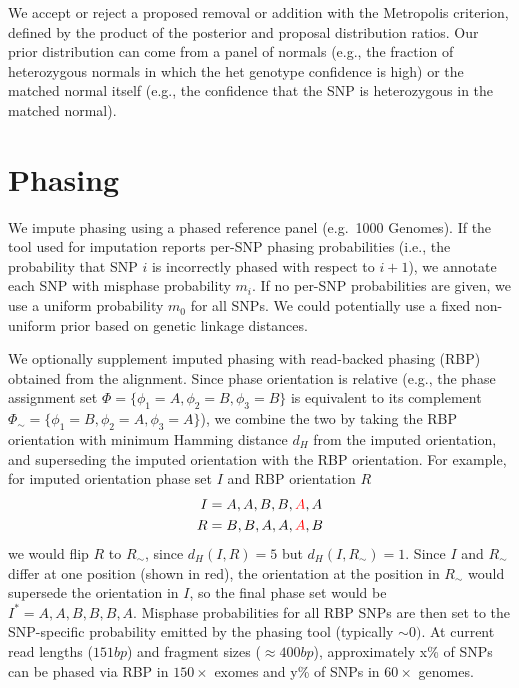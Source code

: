 \documentclass[10pt,letter]{article}
\numberwithin{equation}{section}
\newcommand{\rt}{\right}
\newcommand{\lt}{\left}
\begin{document}
We accept or reject a proposed removal or addition with the Metropolis criterion, defined by the product of the posterior and proposal distribution ratios. Our prior distribution can come from a panel of normals (e.g., the fraction of heterozygous normals in which the het genotype confidence is high) or the matched normal itself (e.g., the confidence that the SNP is heterozygous in the matched normal).


\section{Phasing}

We impute phasing using a phased reference panel (e.g.\ 1000 Genomes). If the tool used for imputation reports per-SNP phasing probabilities (i.e., the probability that SNP $i$ is incorrectly phased with respect to $i+1$), we annotate each SNP with misphase probability $m_i$. If no per-SNP probabilities are given, we use a uniform probability $m_0$ for all SNPs. We could potentially use a fixed non-uniform prior based on genetic linkage distances.

We optionally supplement imputed phasing with read-backed phasing (RBP) obtained from the alignment. Since phase orientation is relative (e.g., the phase assignment set $\Phi=\{\phi_1=A,\phi_2=B,\phi_3=B\}$ is equivalent to its complement $\Phi_\sim=\{\phi_1=B,\phi_2=A,\phi_3=A\}$), we combine the two by taking the RBP orientation with minimum Hamming distance $d_H$ from the imputed orientation, and superseding the imputed orientation with the RBP orientation. For example, for imputed orientation phase set $I$ and RBP orientation $R$
\begin{align*}
I &= {A,A,B,B,\textcolor{red}{A},A}\\
R &= {B,B,A,A,\textcolor{red}{A},B}
\end{align*}
we would flip $R$ to $R_{\sim}$, since $d_H(I,R)=5$ but $d_H(I,R_\sim)=1$. Since $I$ and $R_\sim$ differ at one position (shown in red), the orientation at the position in $R_\sim$ would supersede the orientation in $I$, so the final phase set would be $I^\ast=A,A,B,B,B,A$. Misphase probabilities for all RBP SNPs are then set to the SNP-specific probability emitted by the phasing tool (typically $\sim 0)$. At current read lengths ($151\unit{bp}$) and fragment sizes ($\approx 400\unit{bp}$), approximately x\% of SNPs can be phased via RBP in $150\times$ exomes and y\% of SNPs in $60\times$ genomes.
\end{document}
